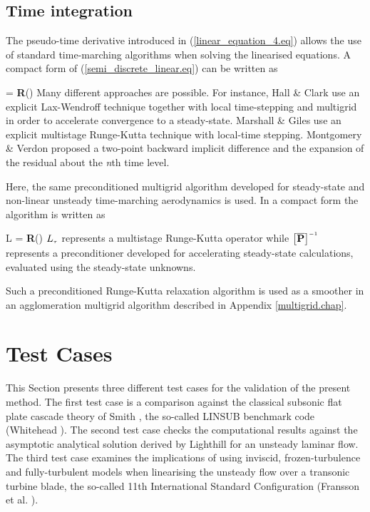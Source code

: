 \subsection{Time integration}
%
 The pseudo-time derivative introduced in (\ref{linear_equation_4.eq})
 allows the use of standard time-marching algorithms when solving
 the linearised equations. A compact form of (\ref{semi_discrete_linear.eq})
 can be written as

%
\beq
  = 
 {\bf R}\left(\right)
\eeq
%
 Many different approaches are possible.
 For instance,  Hall \& Clark \citeyear{Hall:4} use an explicit Lax-Wendroff technique
 together with local time-stepping and multigrid in order to accelerate convergence to
 a steady-state. Marshall \& Giles \citeyear{Giles:8} use an explicit multistage Runge-Kutta
 technique with local-time stepping.
 Montgomery \& Verdon \citeyear{Verdon:3} proposed a two-point
 backward implicit difference and the expansion
 of the residual about the {\em n}th time level.

 Here, the same preconditioned multigrid algorithm developed for steady-state
 and non-linear unsteady time-marching aerodynamics is used.
 In a compact form the algorithm is written as

%
\beq
  L\sm{\tau} \delta {} =
  {\bf R}\left(\right)
  \label{time_linear.eq}
\eeq
%
 $L_{\mbox{\tiny $\tau$}}$ represents a multistage Runge-Kutta operator while
 $\left[\overline{\bf P}\right]^{\mbox{\tiny $-1$}}$
 represents a preconditioner developed for accelerating steady-state
 calculations, evaluated using the steady-state unknowns.

 Such a preconditioned Runge-Kutta relaxation algorithm is used as
 a smoother in an agglomeration multigrid algorithm described in Appendix
 \ref{multigrid.chap}.
%
%
%
%
%
\section{Test Cases}
%
 This Section presents three different test cases for the validation of the
 present method. The first test case is a comparison against the classical subsonic
 flat plate cascade theory of Smith \citeyear{Smith:1},
 the so-called LINSUB benchmark code (Whitehead ).
 The second test case checks the computational results against the
 asymptotic analytical solution derived by Lighthill \citeyear{Lighthill:1}
 for an unsteady laminar flow. The third test case examines the implications
 of using inviscid, frozen-turbulence and fully-turbulent models when linearising
 the unsteady flow over a transonic  turbine blade, the so-called 11th International
 Standard Configuration  (Fransson et al. ).
%
%

%

%

%
%
